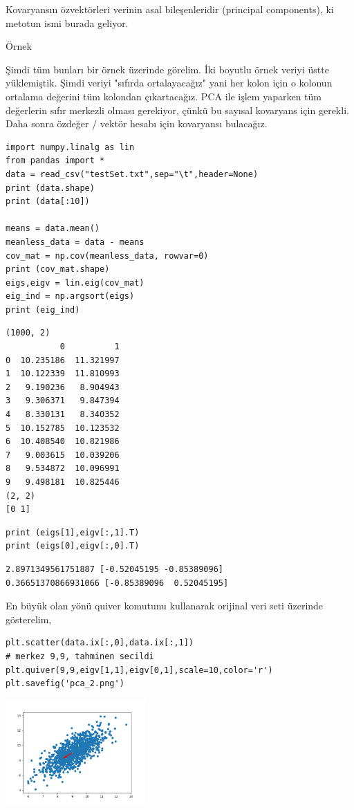 \documentclass[12pt,fleqn]{article}\usepackage{../../common}
\begin{document}
Kovaryansın özvektörleri verinin asal bileşenleridir (principal
components), ki metotun ismi burada geliyor.

Örnek

Şimdi tüm bunları bir örnek üzerinde görelim. İki boyutlu örnek veriyi
üstte yüklemiştik. Şimdi veriyi "sıfırda ortalayacağız" yani her kolon için
o kolonun ortalama değerini tüm kolondan çıkartacağız. PCA ile işlem
yaparken tüm değerlerin sıfır merkezli olması gerekiyor, çünkü bu sayısal
kovaryans için gerekli. Daha sonra özdeğer / vektör hesabı için kovaryansı
bulacağız.

\begin{verbatim}
import numpy.linalg as lin
from pandas import *
data = read_csv("testSet.txt",sep="\t",header=None)
print (data.shape)
print (data[:10])

means = data.mean()
meanless_data = data - means
cov_mat = np.cov(meanless_data, rowvar=0)
print (cov_mat.shape)
eigs,eigv = lin.eig(cov_mat)
eig_ind = np.argsort(eigs)
print (eig_ind)
\end{verbatim}

\begin{verbatim}
(1000, 2)
           0          1
0  10.235186  11.321997
1  10.122339  11.810993
2   9.190236   8.904943
3   9.306371   9.847394
4   8.330131   8.340352
5  10.152785  10.123532
6  10.408540  10.821986
7   9.003615  10.039206
8   9.534872  10.096991
9   9.498181  10.825446
(2, 2)
[0 1]
\end{verbatim}

\begin{verbatim}
print (eigs[1],eigv[:,1].T)
print (eigs[0],eigv[:,0].T)
\end{verbatim}

\begin{verbatim}
2.8971349561751887 [-0.52045195 -0.85389096]
0.36651370866931066 [-0.85389096  0.52045195]
\end{verbatim}

En büyük olan yönü quiver komutunu kullanarak orijinal veri seti
üzerinde gösterelim,

\begin{verbatim}
plt.scatter(data.ix[:,0],data.ix[:,1]) 
# merkez 9,9, tahminen secildi
plt.quiver(9,9,eigv[1,1],eigv[0,1],scale=10,color='r') 
plt.savefig('pca_2.png')
\end{verbatim}

\includegraphics[height=4cm]{pca_2.png}
\end{document}
